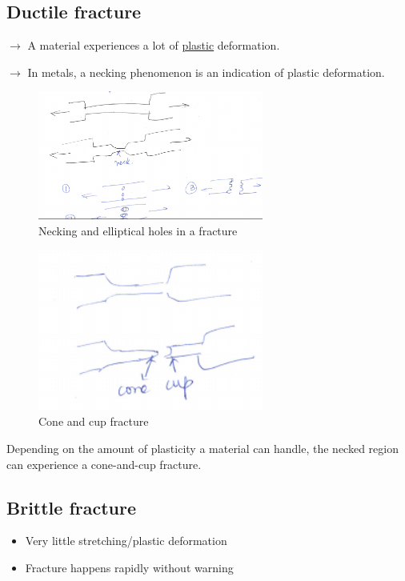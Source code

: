 \documentclass{article}
\begin{document}
\subsection{Ductile fracture}

$\rightarrow$ A material experiences a lot of \underline{plastic} deformation.

$\rightarrow$ In metals, a necking phenomenon is an indication of plastic deformation.

\begin{figure}[H]
	\centering
	\includegraphics[width=0.66\textwidth]{assets/286897da.png}
	\caption{Necking and elliptical holes in a fracture}
\end{figure}

\begin{figure}[h!]
	\centering
	\includegraphics[width=0.66\textwidth]{assets/61ecd582.png}
	\caption{Cone and cup fracture}
\end{figure}

Depending on the amount of plasticity a material can handle, the necked region can experience a cone-and-cup fracture.

\subsection{Brittle fracture}
\begin{itemize}
    \item Very little stretching/plastic deformation
    \item Fracture happens rapidly without warning
\end{itemize}
\end{document}
